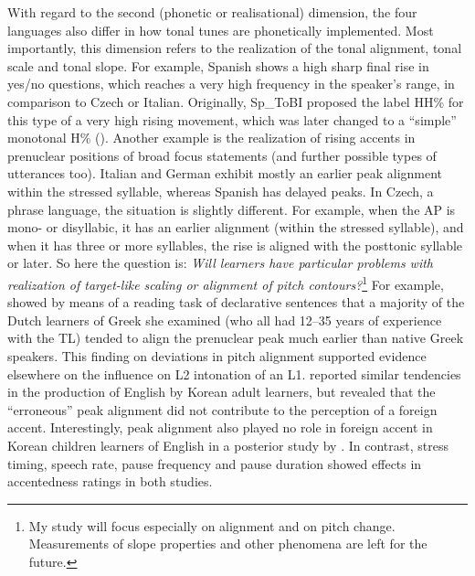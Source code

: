With regard to the second (phonetic or realisational) dimension, the four languages also differ in how tonal tunes are phonetically implemented. Most importantly, this dimension refers to the realization of the tonal alignment, tonal scale and tonal slope. For example, Spanish shows a high sharp final rise in yes/no questions, which reaches a very high frequency in the speaker’s range, in comparison to Czech or Italian. Originally, Sp\_ToBI proposed the label HH\% for this type of a very high rising movement, which was later changed to a “simple” monotonal H\% (\citealt{PrietoRoseano2010}). Another example is the realization of rising accents in prenuclear positions of broad focus statements (and further possible types of utterances too). Italian and German exhibit mostly an earlier peak alignment within the stressed syllable, whereas Spanish has delayed peaks. In Czech, a phrase language, the situation is slightly different. For example, when the AP is mono- or disyllabic, it has an earlier alignment (within the stressed syllable), and when it has three or more syllables, the rise is aligned with the posttonic syllable or later. So here the question is: \textit{Will learners have particular problems with realization of target-like scaling or alignment of pitch contours?}\footnote{My study will focus especially on alignment and on pitch change. Measurements of slope properties and other phenomena are left for the future.} For example, \citet{Mennen2004} showed by means of a reading task of declarative sentences that a majority of the Dutch learners of Greek she examined (who all had 12–35 years of experience with the TL) tended to align the prenuclear peak much earlier than native Greek speakers. This finding on deviations in pitch alignment supported evidence elsewhere on the influence on L2 intonation of an L1. \citet{TrofimovichBaker2006} reported similar tendencies in the production of English by Korean adult learners, but revealed that the “erroneous” peak alignment did not contribute to the perception of a foreign accent. Interestingly, peak alignment also played no role in foreign accent in Korean children learners of English in a posterior study by \citet{TrofimovichBaker2007}. In contrast, stress timing, speech rate, pause frequency and pause duration showed effects in accentedness ratings in both studies.



